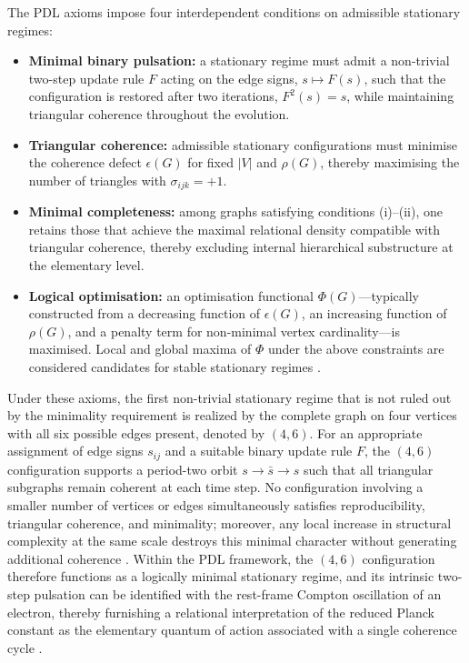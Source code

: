 \documentclass[11pt,a4paper]{article}
\numberwithin{equation}{section}
\begin{document}
The PDL axioms impose four interdependent conditions on admissible stationary regimes:
\begin{itemize}
  \item[(i)] \textbf{Minimal binary pulsation:} a stationary regime must admit a non-trivial two-step update rule $F$ acting on the edge signs, $s\mapsto F(s)$, such that the configuration is restored after two iterations, $F^2(s)=s$, while maintaining triangular coherence throughout the evolution.
  \item[(ii)] \textbf{Triangular coherence:} admissible stationary configurations must minimise the coherence defect $\epsilon(G)$ for fixed $|V|$ and $\rho(G)$, thereby maximising the number of triangles with $\sigma_{ijk}=+1$.
  \item[(iii)] \textbf{Minimal completeness:} among graphs satisfying conditions (i)–(ii), one retains those that achieve the maximal relational density compatible with triangular coherence, thereby excluding internal hierarchical substructure at the elementary level.
  \item[(iv)] \textbf{Logical optimisation:} an optimisation functional $\Phi(G)$—typically constructed from a decreasing function of $\epsilon(G)$, an increasing function of $\rho(G)$, and a penalty term for non-minimal vertex cardinality—is maximised. Local and global maxima of $\Phi$ under the above constraints are considered candidates for stable stationary regimes \cite{LaubscherPDLFull2026,LaubscherLDP2026}.
\end{itemize}

Under these axioms, the first non-trivial stationary regime that is not ruled out by the minimality requirement is realized by the complete graph on four vertices with all six possible edges present, denoted by $(4,6)$. For an appropriate assignment of edge signs $s_{ij}$ and a suitable binary update rule $F$, the $(4,6)$ configuration supports a period-two orbit $s \to \bar{s} \to s$ such that all triangular subgraphs remain coherent at each time step. No configuration involving a smaller number of vertices or edges simultaneously satisfies reproducibility, triangular coherence, and minimality; moreover, any local increase in structural complexity at the same scale destroys this minimal character without generating additional coherence \cite{LaubscherPDLFull2026,LaubscherLDP2026}. Within the PDL framework, the $(4,6)$ configuration therefore functions as a logically minimal stationary regime, and its intrinsic two-step pulsation can be identified with the rest-frame Compton oscillation of an electron, thereby furnishing a relational interpretation of the reduced Planck constant as the elementary quantum of action associated with a single coherence cycle \cite{LaubscherIntroPDL2026,LaubscherPDLFull2026,LaubscherLDP2026}.
\end{document}
